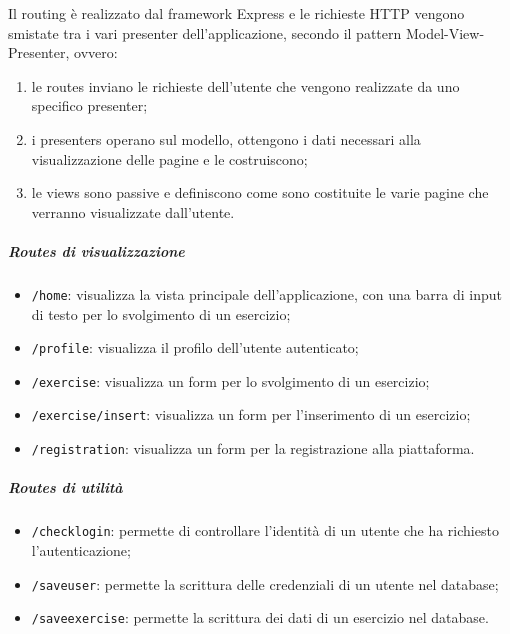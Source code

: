 \noindent Il routing è realizzato dal framework Express e le richieste HTTP vengono smistate tra i vari presenter dell'applicazione, secondo il pattern Model-View-Presenter, ovvero:
\begin{enumerate}
	\item le routes inviano le richieste dell'utente che vengono realizzate da uno specifico presenter;
	\item i presenters operano sul modello, ottengono i dati necessari alla visualizzazione delle pagine e le costruiscono;
	\item le views sono passive e definiscono come sono costituite le varie pagine che verranno visualizzate dall'utente.
\end{enumerate}

\subparagraph*{Routes di visualizzazione}
\begin{itemize}
	\item \texttt{/home}: visualizza la vista principale dell'applicazione, con una barra di input di testo per lo svolgimento di un esercizio;
	\item \texttt{/profile}: visualizza il profilo dell'utente autenticato;
	\item \texttt{/exercise}: visualizza un form per lo svolgimento di un esercizio;
	\item \texttt{/exercise/insert}: visualizza un form per l'inserimento di un esercizio;
	\item \texttt{/registration}: visualizza un form per la registrazione alla piattaforma.
\end{itemize}

\subparagraph*{Routes di utilità}
\begin{itemize}
\item \texttt{/checklogin}: permette di controllare l'identità di un utente che ha richiesto l'autenticazione;
\item \texttt{/saveuser}: permette la scrittura delle credenziali di un utente nel database;
\item \texttt{/saveexercise}: permette la scrittura dei dati di un esercizio nel database.
\end{itemize}
